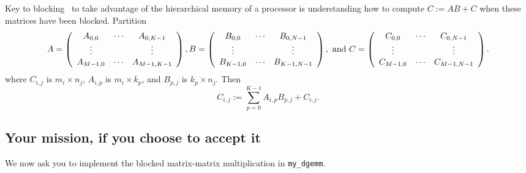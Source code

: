 Key to blocking \Gemm\ to take advantage of the hierarchical memory of
a processor is understanding how to compute $ C := A B + C $ when
these matrices have been blocked.  Partition
{\footnotesize%
\[
A = 
\left( \begin{array}{c c c c}
A_{0,0} & \cdots & A_{0,K-1} \\
\vdots &  & \vdots \\
A_{M-1,0} & \cdots & A_{M-1,K-1} \\
\end{array}
\right),
B = 
\left( \begin{array}{c c c c}
B_{0,0} & \cdots & B_{0,N-1} \\
\vdots &  & \vdots \\
B_{K-1,0} & \cdots & B_{K-1,N-1} \\
\end{array}
\right), \mbox{~and~}
C = 
\left( \begin{array}{c c c c}
C_{0,0} & \cdots & C_{0,N-1} \\
\vdots &  & \vdots \\
C_{M-1,0} & \cdots & C_{M-1,N-1} \\
\end{array}
\right).
\]%
}
where $ C_{i,j} $ is $ m_i \times n_j
$, $ A_{i,p} $ is $ m_i \times k_p
$, and $ B_{p,j} $ is $ k_p \times n_j
$.
Then
\[
C_{i,j} := \sum_{p=0}^{K-1} A_{i,p} B_{p,j} + C_{i,j}.
\]

\subsection{Your mission, if you choose to accept it}
We now ask you to implement the blocked matrix-matrix multiplication in {\tt my\_dgemm}.
